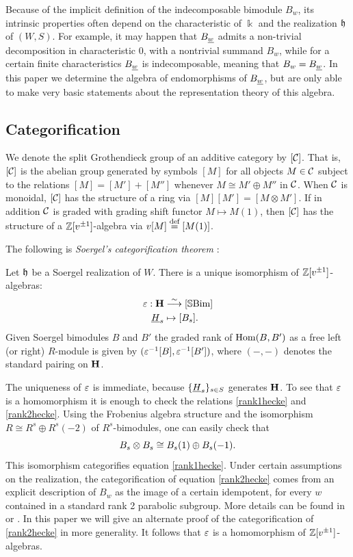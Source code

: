 Because of the implicit definition of the indecomposable bimodule $B_w$, its intrinsic properties often depend on the characteristic of $\Bbbk$ and the realization ${\mathfrak h}$ of $(W,S)$.
For example, it may happen that $B_{\underline{w}}$ admits a non-trivial decomposition in characteristic $0$, with a nontrivial summand $B_w$, while for a certain finite characteristics $B_{\underline{w}}$ is indecomposable, meaning that $B_w = B_{\underline{w}}$. In this paper we determine the algebra of endomorphisms of $B_{\underline{w}}$, but are only able to make very basic statements about the representation theory of this algebra.

\subsection{Categorification}
\label{subsec-SoergelCatfn}

We denote the split Grothendieck group of an additive category by $[{\mathcal{C}}]$. That is, $[{\mathcal{C}}]$ is the abelian group generated by symbols $[M]$ for all objects $M \in {\mathcal{C}}$ subject
to the relations $[M] = [M'] + [M'']$ whenever $M \cong M' \oplus M''$ in ${\mathcal{C}}$. When ${\mathcal{C}}$ is monoidal, $[{\mathcal{C}}]$ has the structure of a ring via $[M][M'] = [M\otimes M']$. If in addition
${\mathcal{C}}$ is graded with grading shift functor $M \mapsto M(1)$, then $[{\mathcal{C}}]$ has the structure of a ${\mathbb{Z}}[v^{\pm 1}]$-algebra via $v[M] \stackrel{\mbox{\scriptsize{def}}}{=} [M(1)]$.

The following is \emph{Soergel's categorification theorem} \cite[Satz 1.10 and Satz 5.15]{Soe3}:

\begin{thm} Let ${\mathfrak h}$ be a Soergel realization of $W$. There is a unique isomorphism of ${\mathbb{Z}}[v^{\pm 1}]$-algebras:
\begin{align*}
\varepsilon: {\mathbf H} &\stackrel{\sim}{\longrightarrow} [\mathbb{S}\textrm{Bim}] \\
\underline{H}_s &\mapsto [B_s].
\end{align*}
Given Soergel bimodules $B$ and $B'$ the graded rank
of $\operatorname{Hom}(B,B')$ as a free left (or right) $R$-module is given by $(\varepsilon^{-1}[B],\varepsilon^{-1}[B'])$, where $(-,-)$ denotes the standard pairing on ${\mathbf H}$.
\label{SoergelThm2}
\end{thm}

The uniqueness of $\varepsilon$ is immediate, because $\{\underline{H}_s\}_{s \in S}$ generates ${\mathbf H}$. To see that $\varepsilon$ is a homomorphism it is enough to check the relations \eqref{rank1hecke} and
\eqref{rank2hecke}. Using the Frobenius algebra structure and the isomorphism $R \cong R^s \oplus R^s(-2)$ of $R^s$-bimodules, one can easily check that \begin{equation} B_s \otimes B_s \cong
B_s(1) \oplus B_s(-1). \label{rank1BS} \end{equation} This isomorphism categorifies equation \eqref{rank1hecke}. Under certain assumptions on the realization, the categorification of
equation \eqref{rank2hecke} comes from an explicit description of $B_w$ as the image of a certain idempotent, for every $w$ contained in a standard rank 2 parabolic subgroup. More details
can be found in \cite[\S 4]{Soe3} or \cite{EDihedral}. In this paper we will give an alternate proof of the categorification of \eqref{rank2hecke} in more generality. It follows that $\varepsilon$
is a homomorphism of ${\mathbb{Z}}[v^{\pm 1}]$-algebras.

